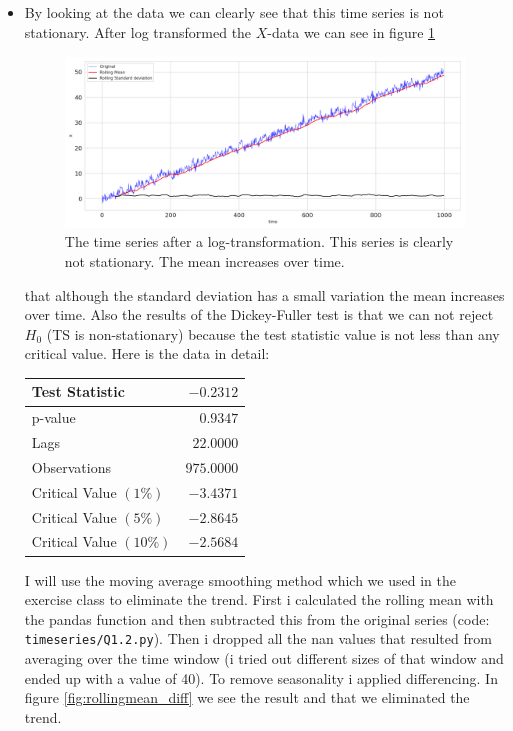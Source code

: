 \documentclass[]{article}
\begin{document}
	\subsection{}
	
	\begin{itemize}
		\item By looking at the data we can clearly see that this time series is not stationary. After log transformed the $X$-data we can see in figure \ref{fig:rollingmean} 
		\begin{figure}
			\centering
			\includegraphics[width=1\textwidth]{images/ts_log.png}
			\caption{The time series after a log-transformation. This series is clearly not stationary. The mean increases over time.}
			\label{fig:rollingmean}
		\end{figure}
		that although the standard deviation has a small variation the mean increases over time. Also the results of the Dickey-Fuller test is that we can not reject $H_0$ (TS is non-stationary) because the test statistic value is not less than any critical value. Here is the data in detail: 
		\begin{center}
			\begin{tabular}{|l|r|}
				\hline Test Statistic & $-0.2312$ \\
				\hline p-value & $0.9347$ \\
				\hline Lags & $22.0000$ \\
				\hline Observations & $975.0000$ \\
				\hline Critical Value $(1 \%)$ & $-3.4371$ \\
				\hline Critical Value $(5 \%)$ & $-2.8645$ \\
				\hline Critical Value $(10 \%)$ & $-2.5684$ \\
				\hline
			\end{tabular}
			\label{tab:dickey}
		\end{center}
		I will use the moving average smoothing method which we used in the exercise class to eliminate the trend. First i calculated the rolling mean with the pandas function and then subtracted this from the original series (code: \texttt{timeseries/Q1.2.py}). Then i dropped all the nan values that resulted from averaging over the time window (i tried out different sizes of that window and ended up with a value of 40). To remove seasonality i applied differencing. In figure \ref{fig:rollingmean_diff} we see the result and that we eliminated the trend.

\end{itemize}
\end{document}
